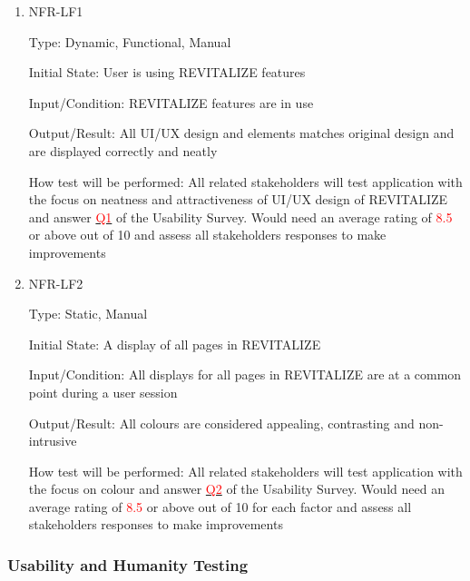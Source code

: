 \documentclass[12pt, titlepage]{article}
\begin{document}
\begin{enumerate}
	
	\item{NFR-LF1\\}
	
	Type: Dynamic, Functional, Manual
	
	Initial State: User is using REVITALIZE features
	
	Input/Condition: REVITALIZE features are in use
	
	Output/Result: All UI/UX design and elements matches original design and are displayed correctly and neatly
	
	How test will be performed: All related stakeholders will test application with the focus on neatness and attractiveness of UI/UX design of REVITALIZE and answer \hyperlink{q1}{\textcolor{red}{Q1}} of the Usability Survey. Would need an average rating of \textcolor{red}{8.5} or above out of 10 and assess all stakeholders responses to make improvements
	
	\item{NFR-LF2\\}
	
	Type: Static, Manual
	
	Initial State: A display of all pages in REVITALIZE
	
	Input/Condition: All displays for all pages in REVITALIZE are at a common point during a user session
	
	Output/Result: All colours are considered appealing, contrasting and non-intrusive
	
	How test will be performed: All related stakeholders will test application with the focus on colour and answer \hyperlink{q2}{\textcolor{red}{Q2}} of the Usability Survey. Would need an average rating of \textcolor{red}{8.5} or above out of 10 for each factor and assess all stakeholders responses to make improvements
	
\end{enumerate}

\subsubsection{Usability and Humanity Testing}
\end{document}
